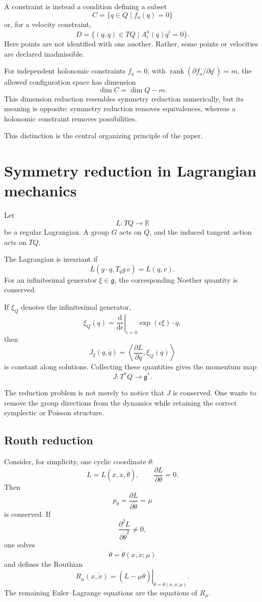 \documentclass[11pt,a4paper]{article}
\newcommand{\R}{\mathbb R}
\newcommand{\dd}{\mathrm d}
\newcommand{\g}{\mathfrak g}
\newcommand{\rank}{\operatorname{rank}}
\theoremstyle{definition}
\begin{document}
A constraint is instead a condition defining a subset
\[
        C=\{q\in Q\mid f_a(q)=0\}
\]
or, for a velocity constraint,
\[
        D=\{(q,\dot q)\in TQ\mid A^a_i(q)\dot q^i=0\}.
\]
Here points are not identified with one another.  Rather, some points or
velocities are declared inadmissible.

For independent holonomic constraints $f_a=0$, with
$\rank(\partial f_a/\partial q^i)=m$, the allowed configuration space has
dimension
\[
        \dim C=\dim Q-m.
\]
This dimension reduction resembles symmetry reduction numerically, but its
meaning is opposite: symmetry reduction removes equivalences, whereas a
holonomic constraint removes possibilities.

This distinction is the central organizing principle of the paper.

\section{Symmetry reduction in Lagrangian mechanics}

Let
\[
        L:TQ\to\R
\]
be a regular Lagrangian.  A group $G$ acts on $Q$, and the induced tangent
action acts on $TQ$.

The Lagrangian is invariant if
\[
        L(g\cdot q,T_qg\,v)=L(q,v).
\]
For an infinitesimal generator $\xi\in\g$, the corresponding Noether quantity
is conserved.

If $\xi_Q$ denotes the infinitesimal generator,
\[
        \xi_Q(q)=
        \left.\frac{\dd}{\dd\epsilon}\right|_{\epsilon=0}
        \exp(\epsilon\xi)\cdot q,
\]
then
\[
        J_\xi(q,\dot q)
        =
        \left\langle
        \frac{\partial L}{\partial\dot q},
        \xi_Q(q)
        \right\rangle
\]
is constant along solutions.  Collecting these quantities gives the momentum
map
\[
        J:T^*Q\to\g^*.
\]

The reduction problem is not merely to notice that $J$ is conserved.  One
wants to remove the group directions from the dynamics while retaining the
correct symplectic or Poisson structure.

\subsection{Routh reduction}

Consider, for simplicity, one cyclic coordinate $\theta$:
\[
        L=L(x,\dot x,\dot\theta),
        \qquad
        \frac{\partial L}{\partial\theta}=0.
\]
Then
\[
        p_\theta=\frac{\partial L}{\partial\dot\theta}=\mu
\]
is conserved.  If
\[
        \frac{\partial^2L}{\partial\dot\theta^2}\neq0,
\]
one solves
\[
        \dot\theta=\dot\theta(x,\dot x;\mu)
\]
and defines the Routhian
\[
        R_\mu(x,\dot x)
        =
        \left.
        \left(L-\mu\dot\theta\right)
        \right|_{\dot\theta=\dot\theta(x,\dot x;\mu)}.
\]
The remaining Euler--Lagrange equations are the equations of $R_\mu$.
\end{document}
